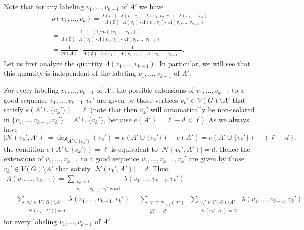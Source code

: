 \documentclass[11pt]{article}
\theoremstyle{definition}
\numberwithin{equation}{section}
\begin{document}
Note that for any labeling $v_1,\dots,v_{k-1}$ of $A'$ we have
\begin{multline}\label{eq-w}
\rho(v_1,\dots,v_k)=\frac{\lambda(v_1)\cdot \lambda(v_1,v_2)\cdot \lambda(v_1,v_2,v_3)\dotsm \lambda(v_1,\dots,v_k)}{\Lambda(\emptyset)\cdot \Lambda(v_1)\cdot \Lambda(v_1, v_2)\dotsm \Lambda(v_1,\dots,v_{k-1})}\\
=\frac{1\dotsm 1\cdot (1/m(\lbrace v_1,\dots,v_{k}\rbrace))}{\Lambda(\emptyset)\cdot \Lambda(v_1)\cdot \Lambda(v_1, v_2)\dotsm \Lambda(v_1,\dots,v_{k-1})}\\
=\frac{1}{m(A)}\cdot \frac{1}{\Lambda(\emptyset)\cdot \Lambda(v_1)\cdot \Lambda(v_1, v_2)\dotsm \Lambda(v_1,\dots,v_{k-1})}.
\end{multline}
Let us first analyze the quantity $\Lambda(v_1,\dots,v_{k-1})$. In particular, we will see that this quantity is independent of the labeling $v_1,\dots,v_{k-1}$ of $A'$.

For every labeling $v_1,\dots,v_{k-1}$ of $A'$, the possible extensions of $v_1,\dots,v_{k-1}$ to a good sequence $v_1,\dots,v_{k-1}, v_k'$ are given by those vertices $v_k'\in V(G)\setminus A'$ that satisfy $e(A'\cup \lbrace v_k'\rbrace)=\ell$ (note that then $v_k'$ will automatically be non-isolated in $\lbrace v_1,\dots,v_{k-1}, v_k'\rbrace=A'\cup \lbrace v_k'\rbrace$, because $e(A')=\ell-d<\ell$). As we always have
\[\vert \mathcal{N}(v_k',A')\vert=\deg_{A'\cup  \lbrace v_k'\rbrace}(v_k')=e(A'\cup \lbrace v_k'\rbrace)-e(A')=e(A'\cup \lbrace v_k'\rbrace)-(\ell-d),\]
the condition $e(A'\cup \lbrace v_k'\rbrace)=\ell$ is equivalent to $\vert \mathcal{N}(v_k',A')\vert=d$. Hence the extensions of $v_1,\dots,v_{k-1}$ to a good sequence $v_1,\dots,v_{k-1}, v_k'$ are given by those $v_k'\in V(G)\setminus A'$  that satisfy $\vert \mathcal{N}(v_k',A')\vert=d$. Thus,
\begin{multline}\label{eq-last-Q}
\Lambda(v_1,\dots,v_{k-1})=\sum_{\substack{v_{k}'\text{ s.t. }\\v_1,\dots,v_{k-1},v_k' \text{ good}}}\lambda(v_1,\dots,v_{k-1}, v_k')\\
=\sum_{\substack{v_{k}'\in V(G)\setminus A'\\\vert \mathcal{N}(v_k',A')\vert=d}}\lambda(v_1,\dots,v_{k-1}, v_k')=\sum_{\substack{\mathcal{X}\subseteq \mathcal{P}\!_{<r}(A')\\ \vert \mathcal{X}\vert=d}}\ \sum_{\substack{v_{k}'\in V(G)\setminus A'\\ \mathcal{N}(v_k',A')=\mathcal{X}}}\lambda(v_1,\dots,v_{k-1}, v_k')
\end{multline}
for every labeling $v_1,\dots,v_{k-1}$ of $A'$.
\end{document}

